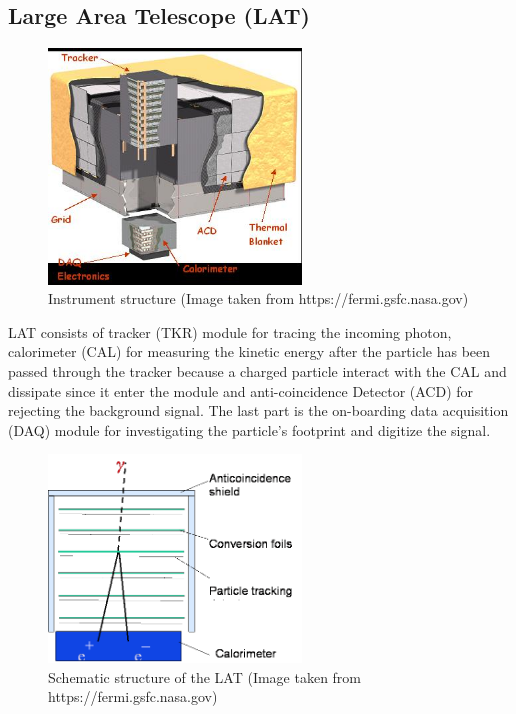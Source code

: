 \subsection{Large Area Telescope (LAT)}


\begin{figure}[h]
    \centering
    \includegraphics[width=0.6\textwidth]{content/background/figures/LATStructure.jpg}
    \caption{Instrument structure (Image taken from https://fermi.gsfc.nasa.gov)}
    \label{fig:fermi_lat_structure}
\end{figure}

LAT consists of tracker (TKR) module for tracing the incoming photon,
calorimeter (CAL) for measuring the kinetic energy after the particle 
has been passed through the tracker because a charged particle 
interact with the CAL and dissipate since it enter the module
and anti-coincidence Detector (ACD) for rejecting the background 
signal. The last part is the on-boarding data acquisition (DAQ)
module for investigating the particle's footprint and digitize
the signal.


\begin{figure}[h]
    \centering
    \includegraphics[width=0.6\textwidth]{content/background/figures/LAT_layers.png}
    \caption{Schematic structure of the LAT (Image taken from https://fermi.gsfc.nasa.gov)}
    \label{fig:fermi_lat_layers}
\end{figure}




